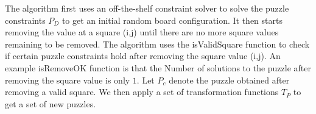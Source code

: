 The algorithm first uses an off-the-shelf constraint solver to solve
the puzzle constraints $P_D$ to get an initial random board
configuration. It then starts removing the value at a square (i,j)
until there are no more square values remaining to be removed. The
algorithm uses the isValidSquare function to check if certain puzzle
constraints hold after removing the square value (i,j). An example
isRemoveOK function is that the Number of solutions to the puzzle
after removing the square value is only $1$. Let $P_c$ denote the puzzle
obtained after removing a valid square. We then apply a set of
transformation functions $T_P$ to get a set of new puzzles.




